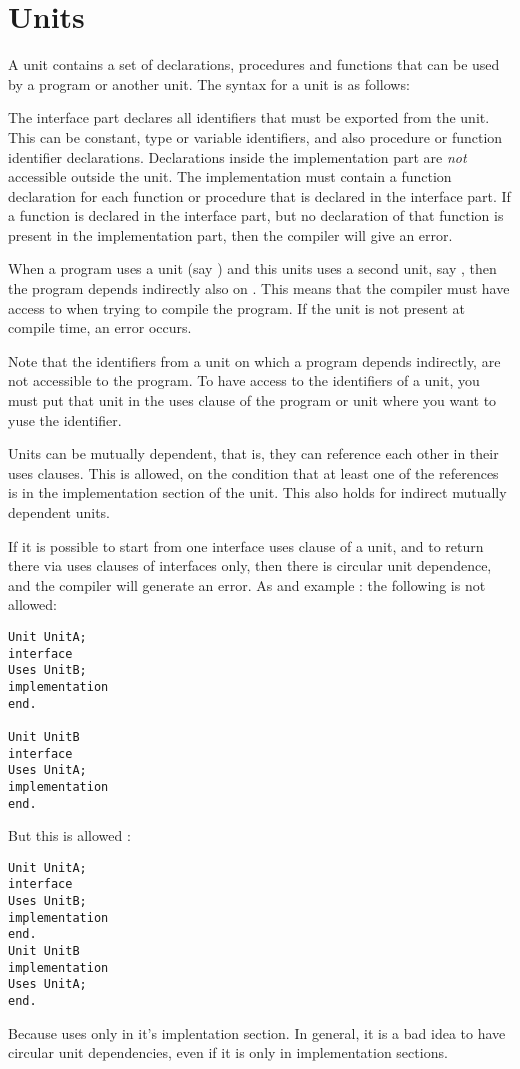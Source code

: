 \documentclass{report}
\begin{document}
\section{Units}
A unit contains a set of declarations, procedures and functions that can be
used by a program or another unit.
The syntax for a unit is as follows:

The interface part declares all identifiers that must be exported from the
unit. This can be constant, type or variable identifiers, and also procedure
or function identifier declarations. Declarations inside the
implementation part are {\em not} accessible outside the unit. The
implementation must contain a function declaration for each function or
procedure that is declared in the interface part. If a function is declared
in the interface part, but no declaration of that function is present in the
implementation part, then the compiler will give an error.

When a program uses a unit (say ) and this units uses a second
unit, say , then the program depends indirectly also on
. This means that the compiler must have access to  when
trying to compile the program. If the unit is not present at compile time,
an error occurs.

Note that the identifiers from a unit on which a program depends indirectly,
are not accessible to the program. To have access to the identifiers of a
unit, you must put that unit in the uses clause of the program or unit where
you want to yuse the identifier.

Units can be mutually dependent, that is, they can reference each other in
their uses clauses. This is allowed, on the condition that at least one of
the references is in the implementation section of the unit. This also holds
for indirect mutually dependent units.

If it is possible to start from one interface uses clause of a unit, and to return
there via uses clauses of interfaces only, then there is circular unit
dependence, and the compiler will generate an error.
As and example : the following is not allowed:
\begin{verbatim}
Unit UnitA;
interface
Uses UnitB;
implementation
end.

Unit UnitB
interface
Uses UnitA;
implementation
end.
\end{verbatim}
But this is allowed :
\begin{verbatim}
Unit UnitA;
interface
Uses UnitB;
implementation
end.
Unit UnitB
implementation
Uses UnitA;
end.
\end{verbatim}
Because  uses  only in it's implentation section.
In general, it is a bad idea to have circular unit dependencies, even if it is
only in implementation sections.
\end{document}
